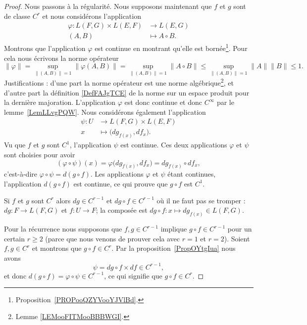\begin{proof}
	Nous passons à la régularité. Nous supposons maintenant que \( f\) et \( g\) sont de classe \( C^r\) et nous considérons l'application
	\begin{equation}
		\begin{aligned}
			\varphi\colon L(F,G)\times L(E,F) & \to L(E,G)        \\
			(A,B)                             & \mapsto A\circ B.
		\end{aligned}
	\end{equation}
	Montrons que l'application \( \varphi\) est continue en montrant qu'elle est bornée\footnote{Proposition~\ref{PROPooQZYVooYJVlBd}.}. Pour cela nous écrivons la norme opérateur
	\begin{equation}
		\| \varphi \|=\sup_{\| (A,B) \|=1}\| \varphi(A,B) \|=\sup_{\| (A,B) \|=1}\| A\circ B \|\leq\sup_{\| (A,B) \|=1}\| A \|\| B \|\leq 1.
	\end{equation}
	Justifications : d'une part la norme opérateur est une norme algébrique\footnote{Lemme \ref{LEMooFITMooBBBWGI}.}, et d'autre part la définition \ref{DefFAJgTCE} de la norme sur un espace produit pour la dernière majoration. L'application \( \varphi\) est donc continue et donc \(  C^{\infty}\) par le lemme~\ref{LemLLvgPQW}. Nous considérons également l'application
	\begin{equation}
		\begin{aligned}
			\psi\colon U & \to L(F,G)\times L(E,F)             \\
			x            & \mapsto \big( dg_{f(x)},df_x \big).
		\end{aligned}
	\end{equation}
	Vu que \( f\) et \( g\) sont \( C^1\), l'application \( \psi\) est continue. Ces deux applications \( \varphi\) et \( \psi\) sont choisies pour avoir
	\begin{equation}
		(\varphi\circ\psi)(x)=\varphi\big( dg_{f(x)},df_x \big)=dg_{f(x)}\circ df_x,
	\end{equation}
	c'est-à-dire \( \varphi\circ\psi=d(g\circ f)\). Les applications \( \varphi\) et \( \psi\) étant continues, l'application \( d(g\circ f)\) est continue, ce qui prouve que \( g\circ f\) est \( C^1\).

	Si \( f\) et \( g\) sont \( C^r\) alors \( dg\in C^{r-1}\) et \( dg\circ f\in C^{r-1}\) où il ne faut pas se tromper : \( dg\colon F\to L(F,G)\) et \( f\colon U\to F\); la composée est \( dg\circ f\colon x\mapsto dg_{f(x)}\in L(F,G)\).

	Pour la récurrence nous supposons que \( f,g\in C^{r-1}\) implique \( g\circ f\in C^{r-1}\) pour un certain \( r\geq 2\) (parce que nous venons de prouver cela avec \( r=1\) et \( r=2\)). Soient \( f,g\in C^r\) et montrons que \( g\circ f\in C^r\). Par la proposition~\ref{PropOYtgIua} nous avons
	\begin{equation}
		\psi=dg\circ f\times df\in C^{r-1},
	\end{equation}
	et donc \( d(g\circ f)=\varphi\circ\psi\in C^{r-1}\), ce qui signifie que \( g\circ f\in C^r\).
\end{proof}

